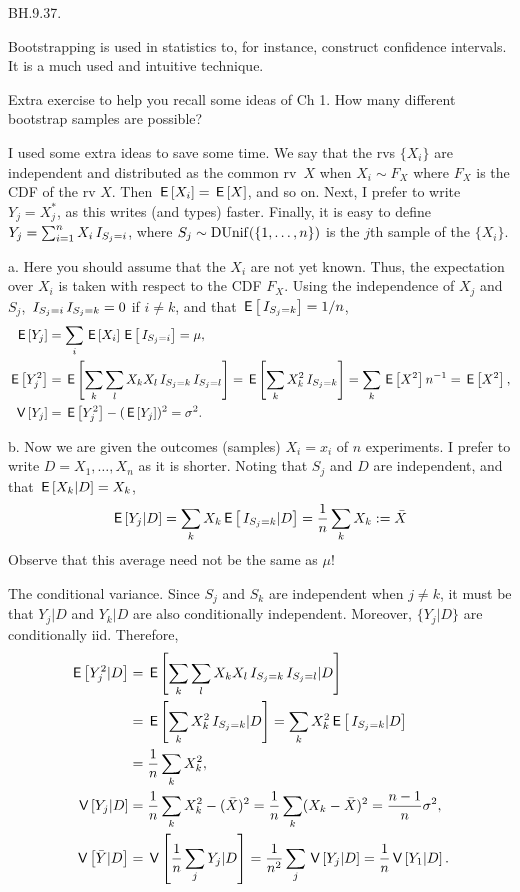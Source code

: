 \setcounter{theorem}{36}
\begin{exercise}
BH.9.37.

Bootstrapping is used in statistics to, for instance, construct confidence intervals. It is a much used and intuitive technique.

Extra exercise to  help you recall some ideas of Ch 1. How many different bootstrap samples are possible?

I used some extra ideas to save some time. We say that the rvs $\{X_i\}$ are independent and  distributed as the common rv~$X$ when $X_i\sim F_X$ where $F_X$ is the CDF of the rv $X$. Then $\,\mathsf{E}\left[X_{i}\right]=\,\mathsf{E}\left[X\right]$, and so on.  Next,  I prefer to write $Y_{j}= X_j^{*}$, as this writes (and types) faster. Finally,  it is easy to define
$Y_j = \sum_{i=1}^n X_i\,I_{S_j = i}$, where $S_{j}\sim \mathrm{DUnif}(\{1, \ldots, n\})$ is the \(j\)th sample of the $\{X_{i}\}$.
 \begin{solution}

a. Here you should assume that the $X_i$ are not yet known. Thus, the expectation over $X_i$ is taken with respect to the CDF $F_X$. Using the independence of $X_j$ and $S_j$, $\,I_{S_j=i}\,I_{S_j=k} = 0$ if $i\neq k$, and that $\,\mathsf{E}\left[\,I_{S_j=k}\right] = 1/n$,
\begin{align*}
\,\mathsf{E}\left[Y_j\right] &= \sum_i \,\mathsf{E}\left[X_i\right]\,\mathsf{E}\left[\,I_{S_{j}=i}\right] = \mu, \\
\,\mathsf{E}\left[Y_j^2\right]  &= \,\mathsf{E}\left[\sum_k\sum_{l} X_k X_{l} \,I_{S_j=k}\,I_{S_{j}=l}\right]
= \,\mathsf{E}\left[\sum_k X_k^{2}  \,I_{S_j=k}\right] =\sum_{k} \,\mathsf{E}\left[X^{2}\right] n^{-1} = \,\mathsf{E}\left[X^{2}\right], \\
\,\mathsf{V}\left[Y_j\right]&= \,\mathsf{E}\left[Y_j^{2}\right]- (\,\mathsf{E}\left[Y_{j}\right])^{2} = \sigma^{2}.
\end{align*}

b. Now we are given the outcomes (samples) $X_i=x_i$ of $n$ experiments.
I prefer to write $D = X_{1}, \ldots, X_{n}$ as it is shorter.
Noting that $S_j$ and $D$ are independent, and that $\,\mathsf{E}\left[X_{k}|D\right] = X_{k}$,
\begin{align*}
  \,\mathsf{E}\left[Y_{j}|D\right] = \sum_k X_k \,\mathsf{E}\left[\,I_{S_j=k}|D\right] = \frac 1 n \sum_k X_k := \bar X
\end{align*}
Observe that this average  need  not be the same as $\mu$!

The conditional variance. Since $S_j$ and $S_k$ are independent when $j\neq k$, it must be that $Y_j|D$ and $Y_k|D$ are also conditionally independent. Moreover, $\{Y_j|D\}$ are conditionally iid. Therefore,
\begin{align*}
\,\mathsf{E}\left[Y_{j}^{2}|D\right]
&= \,\mathsf{E}\left[\sum_k\sum_l X_kX_l\,I_{S_j=k}\,I_{S_j=l}|D\right] \\
&= \,\mathsf{E}\left[\sum_kX_k^{2}\,I_{S_j=k}|D\right]  = \sum_kX_k^{2}\,\mathsf{E}\left[\,I_{S_j=k}|D\right] \\
&= \frac 1 n \sum_{k} X_k^{2}, \\
\,\mathsf{V}\left[Y_j| D\right] &= \frac 1 n \sum_{k} X_k^{2} - (\bar X)^{2} = \frac 1 n \sum_{k} (X_k - \bar X)^{2} = \frac{n-1}n \sigma^{2},\\
\,\mathsf{V}\left[\bar Y|D\right] &= \,\mathsf{V}\left[\frac 1 n\sum_{j}Y_{j}|D\right] = \frac 1{n^{2}} \sum_j \,\mathsf{V}\left[Y_j|D\right] = \frac 1 n \,\mathsf{V}\left[Y_1|D\right].
\end{align*}



\end{solution}
\end{exercise}
